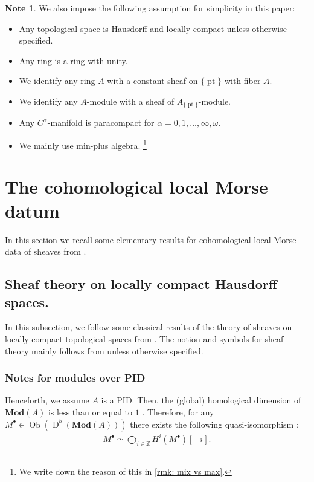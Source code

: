 \documentclass[a4paper,dvipdfmx,reqno,12pt]{amsart}
\theoremstyle{definition}
\newtheorem{Note}[theorem]{Note}
\newcommand{\Z}{\mathbb{Z}}%
\newcommand{\opn}[1]{\operatorname{#1}}
\newcommand{\catn}[1]{\mathbf{#1}}
\newcommand{\myfootnote}[1]{\hspace{-5pt}\footnote{#1}}
\numberwithin{equation}{section}
\begin{document}
\begin{Note}
We also impose the following assumption for simplicity in this paper:
\begin{itemize}
\item Any topological space is Hausdorff and
locally compact unless otherwise specified.
\item Any ring is a ring with unity.
\item We identify any ring $A$ with a constant sheaf on
$\{\opn{pt}\}$ with fiber $A$.
\item We identify any $A$-module with a sheaf of 
$A_{\{\opn{pt}\}}$-module.
\item Any $C^{\alpha}$-manifold is paracompact for 
$\alpha=0,1,\ldots,\infty,\omega$.
\item We mainly use min-plus algebra.
\myfootnote{We write down the reason of this in 
\cref{rmk: mix vs max}.}
\end{itemize}



\end{Note}

\section{The cohomological local Morse datum}
In this section we recall some elementary results
for cohomological local Morse data of sheaves from
\cite{MR2031639,MR1299726,MR4294126}.



\subsection{Sheaf theory on locally compact 
Hausdorff spaces.}
In this subsection, we follow some classical results of
the theory of sheaves on locally compact topological
spaces from \cite{iversenCohomologySheaves1986a,
MR1299726,MR1269324,MR2050072}.
The notion and symbols for 
sheaf theory mainly follows from \cite{MR1299726}
unless otherwise specified.

\subsubsection{Notes for modules over PID}

Henceforth, we assume $A$ is a PID. 
Then, the (global) homological dimension of 
$\catn{Mod}(A)$ is less than or equal to $1$
\cite[Exercise I.17, I.28]{MR1299726}.
Therefore, for any $M^{\bullet}\in \opn{Ob}(\opn{D}^{b}(\catn{Mod}(A)))$
there exists the following quasi-isomorphism 
\cite[Exercise I.18]{MR1299726}:
\begin{align}
M^{\bullet}\simeq 
\bigoplus_{i\in \Z}H^{i}(M^{\bullet})[-i].
\end{align}
\end{document}
